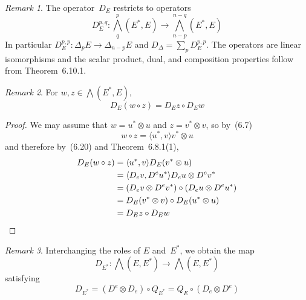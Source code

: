 \documentclass[letterpaper,12pt]{article}
\newcommand{\after}{\circ}
\newcommand{\tprod}{\otimes}
\newcommand{\bigeprod}{\bigwedge}
\newcommand{\medeprod}{{\textstyle\bigeprod}}
\newcommand{\sprod}[2]{\langle#1,#2\rangle}
\theoremstyle{definition}
\theoremstyle{remark}
\newtheorem*{rmk}{Remark}
\begin{document}
\begin{rmk}
The operator~\(D_E\) restricts to operators
\[D_E^{p,q}:\medeprod^p_q(E^*,E)\to\medeprod^{n-q}_{n-p}(E^*,E)\]
In particular \(D_E^{p,p}:\Delta_p E\to\Delta_{n-p}E\) and \(D_{\Delta}=\sum_p D_E^{p,p}\). The operators are linear isomorphisms and the scalar product, dual, and composition properties follow from Theorem~6.10.1.
\end{rmk}

\begin{rmk}
For \(w,z\in\medeprod(E^*,E)\),
\[D_E(w\after z)=D_Ez\after D_Ew\]
\end{rmk}
\begin{proof}
We may assume that \(w=u^*\tprod u\) and \(z=v^*\tprod v\), so by~(6.7)
\[w\after z=\sprod{u^*}{v}v^*\tprod u\]
and therefore by~(6.20) and Theorem~6.8.1(1),
\begin{align*}
D_E(w\after z)&=\sprod{u^*}{v}D_E(v^*\tprod u)\\
	&=\sprod{D_e v}{D^e u^*}D_e u\tprod D^e v^*\\
	&=(D_e v\tprod D^e v^*)\after(D_e u\tprod D^e u^*)\\
	&=D_E(v^*\tprod v)\after D_E(u^*\tprod u)\\
	&=D_Ez\after D_Ew\qedhere
\end{align*}
\end{proof}

\begin{rmk}
Interchanging the roles of \(E\) and~\(E^*\), we obtain the map
\[D_{E^*}:\medeprod(E,E^*)\to\medeprod(E,E^*)\]
satisfying
\[D_{E^*}=(D^e\tprod D_e)\after Q_{E^*}=Q_E\after(D_e\tprod D^e)\]
\end{rmk}
\end{document}
